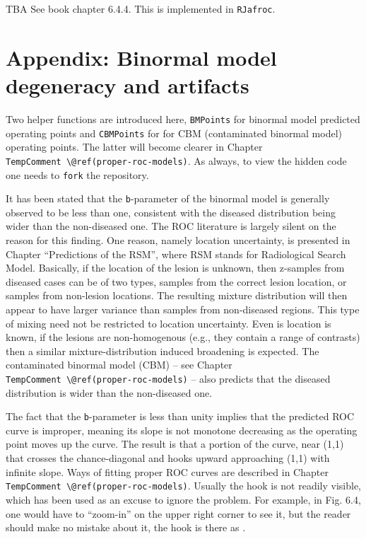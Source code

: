 \documentclass[
]{book}
\begin{document}
TBA See book chapter 6.4.4. This is implemented in \texttt{RJafroc}.

\hypertarget{binormal-model-degeneracy-artifacts}{%
\section{Appendix: Binormal model degeneracy and artifacts}\label{binormal-model-degeneracy-artifacts}}

Two helper functions are introduced here, \texttt{BMPoints} for binormal model predicted operating points and \texttt{CBMPoints} for for CBM (contaminated binormal model) operating points. The latter will become clearer in Chapter \texttt{TempComment\ \textbackslash{}@ref(proper-roc-models)}. As always, to view the hidden code one needs to \texttt{fork} the repository.

It has been stated that the \texttt{b}-parameter of the binormal model is generally observed to be less than one, consistent with the diseased distribution being wider than the non-diseased one. The ROC literature is largely silent on the reason for this finding. One reason, namely location uncertainty, is presented in Chapter ``Predictions of the RSM'', where RSM stands for Radiological Search Model. Basically, if the location of the lesion is unknown, then z-samples from diseased cases can be of two types, samples from the correct lesion location, or samples from non-lesion locations. The resulting mixture distribution will then appear to have larger variance than samples from non-diseased regions. This type of mixing need not be restricted to location uncertainty. Even is location is known, if the lesions are non-homogenous (e.g., they contain a range of contrasts) then a similar mixture-distribution induced broadening is expected. The contaminated binormal model (CBM) -- see Chapter \texttt{TempComment\ \textbackslash{}@ref(proper-roc-models)} -- also predicts that the diseased distribution is wider than the non-diseased one.

The fact that the \texttt{b}-parameter is less than unity implies that the predicted ROC curve is improper, meaning its slope is not monotone decreasing as the operating point moves up the curve. The result is that a portion of the curve, near (1,1) that crosses the chance-diagonal and hooks upward approaching (1,1) with infinite slope. Ways of fitting proper ROC curves are described in Chapter \texttt{TempComment\ \textbackslash{}@ref(proper-roc-models)}. Usually the hook is not readily visible, which has been used as an excuse to ignore the problem. For example, in Fig. 6.4, one would have to ``zoom-in'' on the upper right corner to see it, but the reader should make no mistake about it, the hook is there as .
\end{document}
